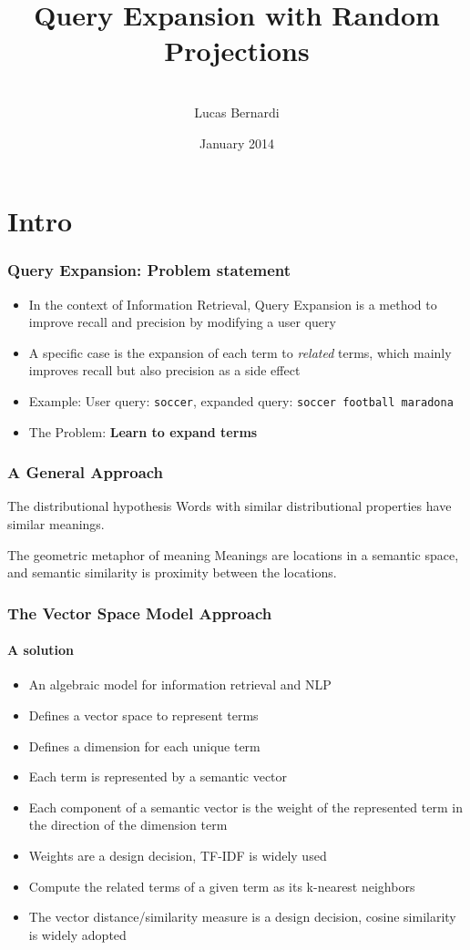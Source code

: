\documentclass{beamer}
\title[Query Expansion with Random Embeddings]{Query Expansion with Random Projections}
\author[Lucas Bernardi]{\\[4mm]Lucas Bernardi}
\institute{}
\date{January 2014}
\begin{document}
\frame{\titlepage}

\frame{\tableofcontents}

\section{Intro}

\begin{frame}
	\frametitle{Query Expansion: Problem statement}
	\bigskip
	\begin{itemize}
	\item In the context of Information Retrieval, Query Expansion is a method to improve recall and precision by modifying a user query
  \item A specific case is the expansion of each term to \textit{related} terms, which mainly improves recall but also precision as a side effect
  \item Example: User query: \texttt{soccer}, expanded query: \texttt{soccer football maradona}
  \item  The Problem: \textbf{Learn to expand terms}
	\end{itemize}
\end{frame}

\begin{frame}
	\frametitle{A General Approach}
	\begin{block}{The distributional hypothesis}
    Words with similar distributional properties have similar meanings.
  \end{block}
\bigskip
	\begin{block}{The geometric metaphor of meaning}
  Meanings are locations in a semantic space, and semantic similarity is proximity between the locations.
  \end{block}
\end{frame}


\begin{frame}
	\frametitle{The Vector Space Model Approach}
	\framesubtitle{A solution}
  \begin{itemize}
    \item	An algebraic model for information retrieval and NLP
    \item	Defines a vector space to represent terms
    \item	Defines a dimension for each unique term
    \item	Each term is represented by a semantic vector
    \item Each component of a semantic vector is the weight of the represented term in the direction of the dimension term
    \item Weights are a design decision, TF-IDF is widely used
    \item Compute the related terms of a given term as its k-nearest neighbors
    \item The vector distance/similarity measure is a design decision, cosine similarity is widely adopted
  \end{itemize}
\end{frame}
\end{document}
